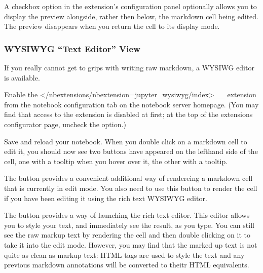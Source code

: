 \documentclass[letterpaper,10pt,english]{sphinxmanual}
\begin{document}

A checkbox option in the extension’s configuration panel optionally allows you to display the preview alongside, rather then below, the markdown cell being edited. The preview disappears when you return the cell to its display mode.


\subsubsection{WYSIWYG “Text Editor” View}
\label{\detokenize{content/00_READ_ME_FIRST/Section_00_06_RoboLab_Environment:WYSIWYG-_u201cText-Editor_u201d-View}}
If you really cannot get to grips with writing raw markdown, a WYSIWG editor is available.

Enable the  \textless{}/nbextensions/nbextension=jupyter\_wysiwyg/index\textgreater{}\textasciigrave{}\_\_ extension from the  notebook configuration tab on the notebook server homepage. (You may find that access to the  extension is disabled at first; at the top of the extensions configurator page, uncheck the  option.)

Save and reload your notebook. When you double click on a markdown cell to edit it, you should now see two buttons have appeared on the left\sphinxhyphen{}hand side of the cell, one with a  tooltip when you hover over it, the other with a  tooltip.

The  button provides a convenient additional way of rendereing a markdown cell that is currently in edit mode. You also need to use this button to render the cell if you have been editing it using the rich text WYSIWYG editor.

The  button provides a way of launching the rich text editor. This editor allows you to style your text, and immediately see the result, as you type. You can still see the raw mark\sphinxhyphen{}up text by rendering the cell and then double clicking on it to take it into the edit mode. However, you may find that the marked up text is not quite as clean as mark\sphinxhyphen{}up text: HTML tags are used to style the text and any previous markdown annotations will be converted to theitr HTML equivalents.
\end{document}
